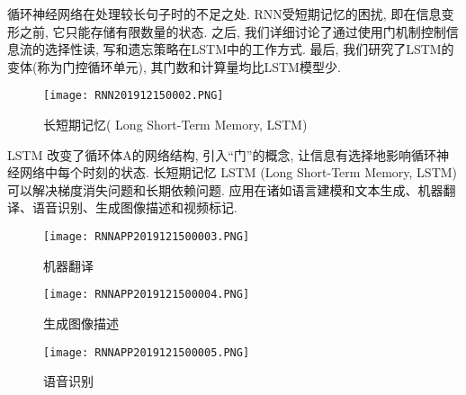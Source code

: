 循环神经网络在处理较长句子时的不足之处. RNN受短期记忆的困扰, 即在信息变形之前, 它只能存储有限数量的状态. 之后, 我们详细讨论了通过使用门机制控制信息流的选择性读, 写和遗忘策略在LSTM中的工作方式. 最后, 我们研究了LSTM的变体(称为门控循环单元), 其门数和计算量均比LSTM模型少.
\begin{figure}[H]
\centering
\texttt{[image: RNN201912150002.PNG]}
\caption{长短期记忆( Long Short-Term Memory, LSTM)}
\label{RNN201912150002}
\vspace{-0.4cm}
\end{figure}
LSTM 改变了循环体A的网络结构, 引入“门”的概念, 让信息有选择地影响循环神经网络中每个时刻的状态.
长短期记忆 LSTM (Long Short-Term Memory,  LSTM)可以解决梯度消失问题和长期依赖问题.
应用在诸如语言建模和文本生成、机器翻译、语音识别、生成图像描述和视频标记.
\begin{figure}[H]
\centering
\texttt{[image: RNNAPP2019121500003.PNG]}
\caption{机器翻译}
\label{RNNAPP2019121500003}
\vspace{-0.4cm}
\end{figure}
\begin{figure}[H]
\centering
\texttt{[image: RNNAPP2019121500004.PNG]}
\caption{生成图像描述}
\label{RNNAPP2019121500005}
\vspace{-0.4cm}
\end{figure}
\begin{figure}[H]
\centering
\texttt{[image: RNNAPP2019121500005.PNG]}
\caption{语音识别}
\label{RNNAPP2019121500005}
\vspace{-0.4cm}
\end{figure}
